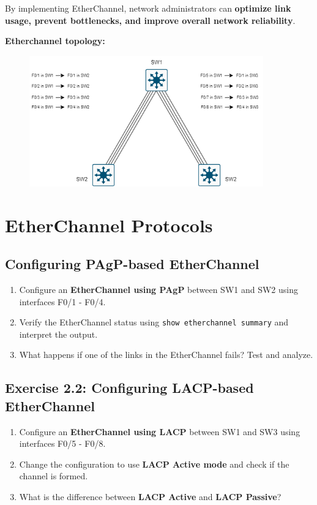 \documentclass[a4paper]{article}
\begin{document}
By implementing EtherChannel, network administrators can \textbf{optimize link usage, prevent bottlenecks, and improve overall network reliability}.

\newpage
\textbf{Etherchannel topology:}
\vspace{4cm}
\begin{figure}[h]
	\centering
	\includegraphics[width=0.9\textwidth]{img/Aggrigation-manual-01.png}
	\caption{\textit{}}
\end{figure}
\newpage
\section{EtherChannel Protocols}
\subsection{Configuring PAgP-based EtherChannel}
\begin{enumerate}
    \item Configure an \textbf{EtherChannel using PAgP} between SW1 and SW2 using interfaces F0/1 - F0/4.
    \item Verify the EtherChannel status using \texttt{show etherchannel summary} and interpret the output.
    \item What happens if one of the links in the EtherChannel fails? Test and analyze.
\end{enumerate}

\subsection{Exercise 2.2: Configuring LACP-based EtherChannel}
\begin{enumerate}
    \item Configure an \textbf{EtherChannel using LACP} between SW1 and SW3 using interfaces F0/5 - F0/8.
    \item Change the configuration to use \textbf{LACP Active mode} and check if the channel is formed.
    \item What is the difference between \textbf{LACP Active} and \textbf{LACP Passive}?
\end{enumerate}
\end{document}
